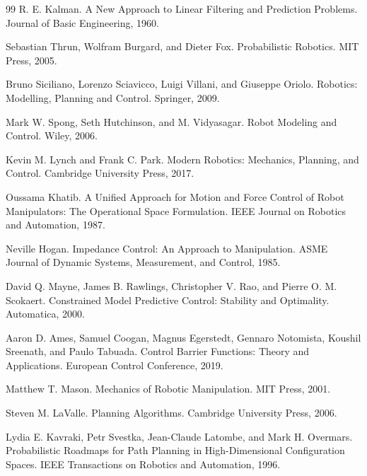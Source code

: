 \documentclass[11pt,oneside,openany]{oblivoir}
\numberwithin{section}{chapter}
\numberwithin{subsection}{section}
\numberwithin{equation}{chapter}
\begin{document}
\backmatter

\clearpage

\begin{thebibliography}{99}
R. E. Kalman.
\newblock A New Approach to Linear Filtering and Prediction Problems.
\newblock Journal of Basic Engineering, 1960.

Sebastian Thrun, Wolfram Burgard, and Dieter Fox.
\newblock Probabilistic Robotics.
\newblock MIT Press, 2005.

Bruno Siciliano, Lorenzo Sciavicco, Luigi Villani, and Giuseppe Oriolo.
\newblock Robotics: Modelling, Planning and Control.
\newblock Springer, 2009.

Mark W. Spong, Seth Hutchinson, and M. Vidyasagar.
\newblock Robot Modeling and Control.
\newblock Wiley, 2006.

Kevin M. Lynch and Frank C. Park.
\newblock Modern Robotics: Mechanics, Planning, and Control.
\newblock Cambridge University Press, 2017.

Oussama Khatib.
\newblock A Unified Approach for Motion and Force Control of Robot Manipulators: The Operational Space Formulation.
\newblock IEEE Journal on Robotics and Automation, 1987.

Neville Hogan.
\newblock Impedance Control: An Approach to Manipulation.
\newblock ASME Journal of Dynamic Systems, Measurement, and Control, 1985.

David Q. Mayne, James B. Rawlings, Christopher V. Rao, and Pierre O. M. Scokaert.
\newblock Constrained Model Predictive Control: Stability and Optimality.
\newblock Automatica, 2000.

Aaron D. Ames, Samuel Coogan, Magnus Egerstedt, Gennaro Notomista, Koushil Sreenath, and Paulo Tabuada.
\newblock Control Barrier Functions: Theory and Applications.
\newblock European Control Conference, 2019.

Matthew T. Mason.
\newblock Mechanics of Robotic Manipulation.
\newblock MIT Press, 2001.

Steven M. LaValle.
\newblock Planning Algorithms.
\newblock Cambridge University Press, 2006.

Lydia E. Kavraki, Petr Svestka, Jean-Claude Latombe, and Mark H. Overmars.
\newblock Probabilistic Roadmaps for Path Planning in High-Dimensional Configuration Spaces.
\newblock IEEE Transactions on Robotics and Automation, 1996.


\end{thebibliography}
\end{document}
